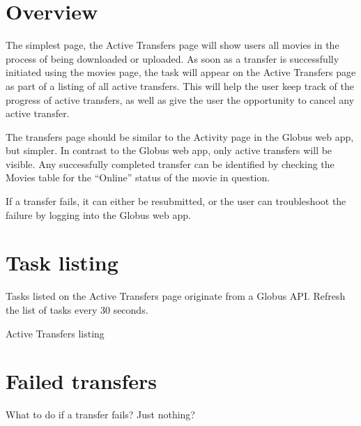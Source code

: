 
\section{Overview}

The simplest page, the Active Transfers page will show users all movies in the
process of being downloaded or uploaded. As soon as a transfer is successfully 
initiated using the movies page, the task will appear on the Active Transfers page 
as part of a listing of all active transfers. This will help the user keep track 
of the progress of active transfers, as well as give the user the opportunity to 
cancel any active transfer. 

The transfers page should be similar to the Activity page in the Globus web app, 
but simpler. In contrast to the Globus web app, only active transfers will be 
visible. Any successfully completed transfer can be identified by checking the 
Movies table for the ``Online'' status of the movie in question.

If a transfer fails, it can either be resubmitted, or the user can troubleshoot 
the failure by logging into the Globus web app.

\section{Task listing}

Tasks listed on the Active Transfers page originate from a Globus API. Refresh 
the list of tasks every 30 seconds.

\begin{table}[h]
    \caption{Active Transfers listing}
\end{table}

\section{Failed transfers}

What to do if a transfer fails? Just nothing?